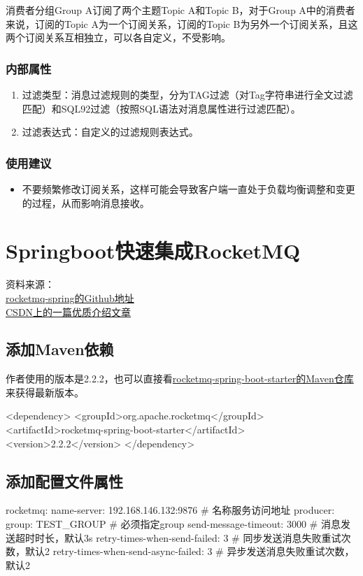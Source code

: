 \documentclass[11pt, a4paper, oneside, fontset=none]{ctexbook}
\begin{document}
消费者分组Group A订阅了两个主题Topic A和Topic B，对于Group A中的消费者来说，订阅的Topic A为一个订阅关系，订阅的Topic B为另外一个订阅关系，且这两个订阅关系互相独立，可以各自定义，不受影响。

\subsection{内部属性}
\begin{enumerate}
  \item 过滤类型：消息过滤规则的类型，分为TAG过滤（对Tag字符串进行全文过滤匹配）和SQL92过滤（按照SQL语法对消息属性进行过滤匹配）。
  \item 过滤表达式：自定义的过滤规则表达式。
\end{enumerate}

\subsection{使用建议}
\begin{itemize}
  \item 不要频繁修改订阅关系，这样可能会导致客户端一直处于负载均衡调整和变更的过程，从而影响消息接收。
\end{itemize}

\chapter{Springboot快速集成RocketMQ}
资料来源：\\
\href{https://github.com/apache/rocketmq-spring/wiki}{rocketmq-spring的Github地址}\\
\href{https://blog.csdn.net/qq_36737803/article/details/112261352}{CSDN上的一篇优质介绍文章}

\section{添加Maven依赖}
作者使用的版本是2.2.2，也可以直接看\href{https://mvnrepository.com/artifact/org.apache.rocketmq}{rocketmq-spring-boot-starter的Maven仓库}来获得最新版本。

\begin{xml}[caption=Maven依赖]
<dependency>
  <groupId>org.apache.rocketmq</groupId>
  <artifactId>rocketmq-spring-boot-starter</artifactId>
  <version>2.2.2</version>
</dependency>
\end{xml}

\section{添加配置文件属性}
\begin{yaml}[caption=配置文件application.yml]
rocketmq:
  name-server: 192.168.146.132:9876 # 名称服务访问地址
  producer:
    group: TEST_GROUP # 必须指定group
    send-message-timeout: 3000 # 消息发送超时时长，默认3s
    retry-times-when-send-failed: 3 # 同步发送消息失败重试次数，默认2
    retry-times-when-send-async-failed: 3 # 异步发送消息失败重试次数，默认2
\end{yaml}
\end{document}
